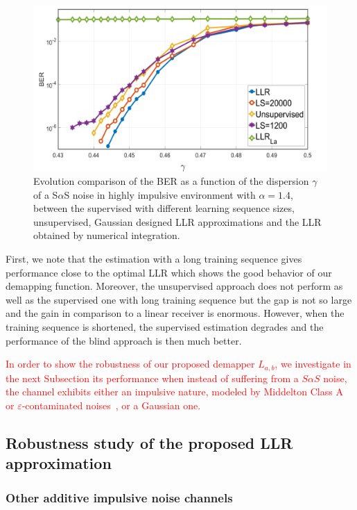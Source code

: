 \documentclass[a4paper]{IEEEtran}
\begin{document}
\begin{figure}
  \centering \includegraphics[width=\linewidth]{fig-11}
  \caption{Evolution comparison of the BER as a function of
    the dispersion $\gamma$ of a S$\alpha$S noise in highly
    impulsive environment with $\alpha=1.4$, between the
    supervised with different learning sequence sizes,
    unsupervised, Gaussian designed LLR approximations and
    the LLR obtained by numerical integration.}
  \label{fig:11}
\end{figure}

First, we note that the estimation with a long training
sequence gives performance close to the optimal LLR which
shows the good behavior of our demapping function. Moreover,
the unsupervised approach does not perform as well as the
supervised one with long training sequence but the gap is
not so large and the gain in comparison to a linear receiver
is enormous. However, when the training sequence is
shortened, the supervised estimation degrades and the
performance of the blind approach is then much better.

\textcolor{red}{In order to show the robustness of our
  proposed demapper $L_{a,b}$, we investigate in the next
  Subsection its performance when instead of suffering from
  a $S\alpha S$ noise, the channel exhibits either an
  impulsive nature, modeled by Middelton Class
  A~\cite{AD-1977} or $\varepsilon$-contaminated
  noises~\cite{Alhussein2017}, or a Gaussian one.}



\subsection{Robustness study of the proposed LLR approximation}
\label{subsection:Robustness}


\subsubsection{Other additive impulsive noise channels}
\end{document}
